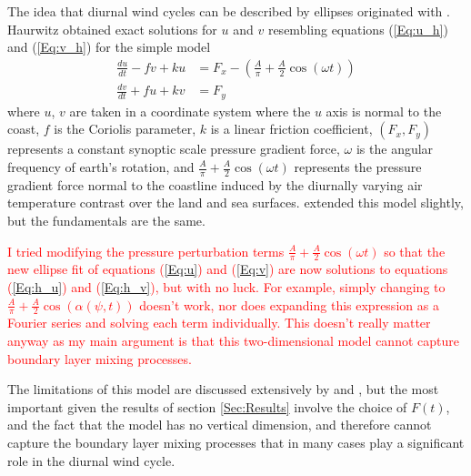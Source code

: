\documentclass{ametsoc}
\begin{document}
The idea that diurnal wind cycles can be described by ellipses originated with \citet{haurwitz47}. Haurwitz obtained exact solutions for $u$ and $v$ resembling equations (\ref{Eq:u_h}) and (\ref{Eq:v_h}) for the simple model
\begin{align}
\frac{du}{dt} - fv + ku &= F_x - \left(\frac{A}{\pi} + \frac{A}{2} \cos \left(\omega t\right) \right) \label{Eq:h_u}\\
\frac{dv}{dt} + fu + kv &= F_y \label{Eq:h_v}
\end{align}
where $u$, $v$ are taken in a coordinate system where the $u$ axis is normal to the coast, $f$ is the Coriolis parameter, $k$ is a linear friction coefficient, $\left(F_x, F_y\right)$ represents a constant synoptic scale pressure gradient force, $\omega$ is the angular frequency of earth's rotation, and $\frac{A}{\pi} + \frac{A}{2} \cos \left(\omega t\right)$ represents the pressure gradient force normal to the coastline induced by the diurnally varying air temperature contrast over the land and sea surfaces. \citet{kusuda83} extended this model slightly, but the fundamentals are the same. 

\textcolor{red}{I tried modifying the pressure perturbation terms $\frac{A}{\pi} + \frac{A}{2} \cos \left(\omega t\right)$ so that the new ellipse fit of equations (\ref{Eq:u}) and (\ref{Eq:v}) are now solutions to equations (\ref{Eq:h_u}) and (\ref{Eq:h_v}), but with no luck. For example, simply changing to $\frac{A}{\pi} + \frac{A}{2} \cos \left(\alpha\left(\psi,t\right)\right)$ doesn't work, nor does expanding this expression as a Fourier series and solving each term individually. This doesn't really matter anyway as my main argument is that this two-dimensional model cannot capture boundary layer mixing processes.}

The limitations of this model are discussed extensively by \citet{haurwitz47} and \citet{kusuda83}, but the most important given the results of section \ref{Sec:Results} involve the choice of $F(t)$, and the fact that the model has no vertical dimension, and therefore cannot capture the boundary layer mixing processes that in many cases play a significant role in the diurnal wind cycle. 
\end{document}
